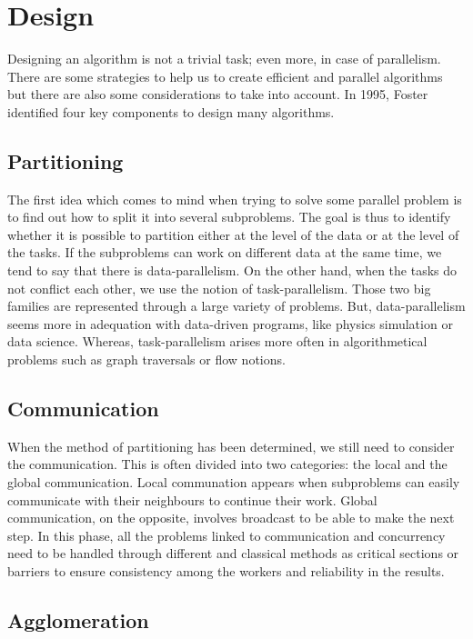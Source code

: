 
\section{Design}

Designing an algorithm is not a trivial task; even more, in case of parallelism. There are some strategies to help us to create efficient and parallel algorithms but there are also some considerations to take into account. In 1995, Foster~\cite{foster1995designing} identified four key components to design many algorithms.

\subsection{Partitioning}

The first idea which comes to mind when trying to solve some parallel problem is to find out how to split it into several subproblems. The goal is thus to identify whether it is possible to partition either at the level of the data or at the level of the tasks. If the subproblems can work on different data at the same time, we tend to say that there is data-parallelism. On the other hand, when the tasks do not conflict each other, we use the notion of task-parallelism. Those two big families are represented through a large variety of problems. But, data-parallelism seems more in adequation with data-driven programs, like physics simulation or data science. Whereas, task-parallelism arises more often in algorithmetical problems such as graph traversals or flow notions.

\subsection{Communication}

When the method of partitioning has been determined, we still need to consider the communication. This is often divided into two categories: the local and the global communication. Local communation appears when subproblems can easily communicate with their neighbours to continue their work. Global communication, on the opposite, involves broadcast to be able to make the next step. In this phase, all the problems linked to communication and concurrency need to be handled through different and classical methods as critical sections or barriers to ensure consistency among the workers and reliability in the results.

\subsection{Agglomeration}

